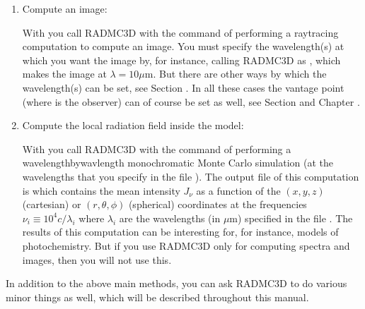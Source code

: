\documentclass[letterpaper,10pt,english]{sphinxmanual}
\begin{document}
\begin{enumerate}
\item {} 
Compute an image:

With  you call RADMC\sphinxhyphen{}3D with the command of performing a
ray\sphinxhyphen{}tracing computation to compute an image. You must specify the
wavelength(s) at which you want the image by, for instance, calling RADMC\sphinxhyphen{}3D
as , which makes the image at
\(\lambda=10\mu\mathrm{m}\). But there are other ways by which the wavelength(s) can be set, see
Section {\hyperref[\detokenize{imagesspectra:sec-set-camera-frequencies}]{}}.  In all these cases the vantage
point (where is the observer) can of course be set as well, see Section
{\hyperref[\detokenize{dustradtrans:sec-dust-ray-tracing}]{}} and Chapter {\hyperref[\detokenize{imagesspectra:chap-images-spectra}]{}}.

\item {} 
Compute the local radiation field inside the model:

With  you call RADMC\sphinxhyphen{}3D with the command of performing a
wavelength\sphinxhyphen{}by\sphinxhyphen{}wavlength monochromatic Monte Carlo simulation (at the
wavelengths that you specify in the file
). The output file of this computation is
 which contains the mean intensity \(J_\nu\) as a
function of the \((x,y,z)\) (cartesian) or \((r,\theta,\phi)\)
(spherical) coordinates at the frequencies \(\nu_i\equiv
10^4c/\lambda_i\) where \(\lambda_i\) are the wavelengths (in
\(\mu\)m) specified in the file . The
results of this computation can be interesting for, for instance, models of
photochemistry. But if you use RADMC\sphinxhyphen{}3D only for computing spectra and
images, then you will not use this.

\end{enumerate}

In addition to the above main methods, you can ask RADMC\sphinxhyphen{}3D to do various minor
things as well, which will be described throughout this manual.
\end{document}
